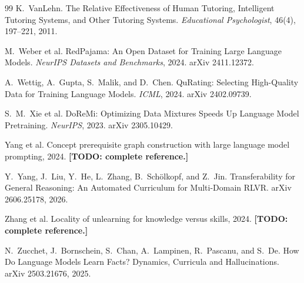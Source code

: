 \documentclass[11pt]{article}
\theoremstyle{plain}
\theoremstyle{definition}
\theoremstyle{remark}
\begin{document}
\begin{thebibliography}{99}
 K.~VanLehn. The Relative Effectiveness of Human
Tutoring, Intelligent Tutoring Systems, and Other Tutoring Systems. \emph{Educational
Psychologist}, 46(4), 197--221, 2011.

 M.~Weber et al. RedPajama: An Open Dataset for
Training Large Language Models. \emph{NeurIPS Datasets and Benchmarks}, 2024. arXiv 2411.12372.

 A.~Wettig, A.~Gupta, S.~Malik, and D.~Chen.
QuRating: Selecting High-Quality Data for Training Language Models. \emph{ICML}, 2024.
arXiv 2402.09739.

 S.~M.~Xie et al. DoReMi: Optimizing Data Mixtures Speeds
Up Language Model Pretraining. \emph{NeurIPS}, 2023. arXiv 2305.10429.

 Yang et al. Concept prerequisite graph construction
with large language model prompting, 2024. \textbf{[TODO: complete reference.]}

 Y.~Yang, J.~Liu, Y.~He, L.~Zhang, B.~Sch\"olkopf, and Z.~Jin.
Transferability for General Reasoning: An Automated Curriculum for Multi-Domain RLVR. arXiv
2606.25178, 2026.

 Zhang et al. Locality of unlearning for knowledge versus
skills, 2024. \textbf{[TODO: complete reference.]}

 N.~Zucchet, J.~Bornschein, S.~Chan, A.~Lampinen,
R.~Pascanu, and S.~De. How Do Language Models Learn Facts? Dynamics, Curricula and Hallucinations.
arXiv 2503.21676, 2025.

\end{thebibliography}
\end{document}
